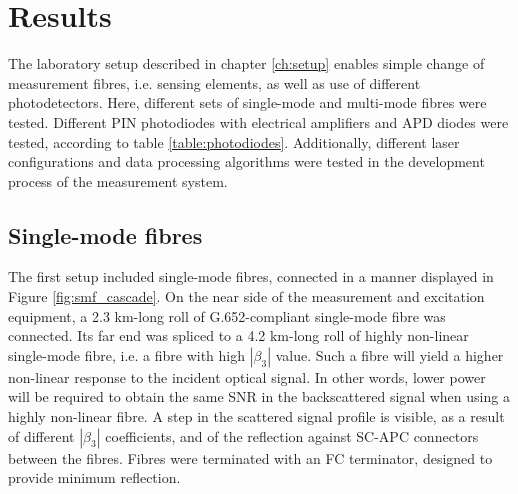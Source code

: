 \documentclass{standalone}
\begin{document}
\chapter{Results}
\setcounter{page}\thestranica


The laboratory setup described in chapter \ref{ch:setup} enables simple change of measurement fibres, i.e. sensing elements, as well as use of different photodetectors. Here, different sets of single-mode and multi-mode fibres were tested. Different PIN photodiodes with electrical amplifiers and APD diodes were tested, according to table \ref{table:photodiodes}. Additionally, different laser configurations and data processing algorithms were tested in the development process of the measurement system.

\section{Single-mode fibres}

The first setup included single-mode fibres, connected in a manner displayed in Figure \ref{fig:smf_cascade}.
On the near side of the measurement and excitation equipment, a 2.3 km-long roll of G.652-compliant single-mode fibre was connected. Its far end was spliced to a 4.2 km-long roll of highly non-linear single-mode fibre, i.e. a fibre with high $\left|\beta_3\right|$ value. Such a fibre will yield a higher non-linear response to the incident optical signal. In other words, lower power will be required to obtain the same SNR in the backscattered signal when using a highly non-linear fibre. A step in the scattered signal profile is visible, as a result of different $\left|\beta_3\right|$ coefficients, and of the reflection against SC-APC connectors between the fibres. Fibres were terminated with an FC terminator, designed to provide minimum reflection. \\
\end{document}
